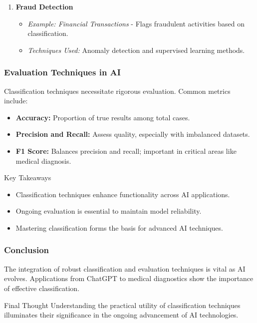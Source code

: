 \documentclass[aspectratio=169]{beamer}
\begin{document}
\begin{frame}[fragile]
\begin{enumerate}
        \item \textbf{Fraud Detection}
            \begin{itemize}
                \item \textit{Example: Financial Transactions} - Flags fraudulent activities based on classification.
                \item \textit{Techniques Used:} Anomaly detection and supervised learning methods.
            \end{itemize}
    \end{enumerate}
\end{frame}

\begin{frame}[fragile]
    \frametitle{Evaluation Techniques in AI}
    
    Classification techniques necessitate rigorous evaluation. Common metrics include:
    
    \begin{itemize}
        \item \textbf{Accuracy:} Proportion of true results among total cases.
        \item \textbf{Precision and Recall:} Assess quality, especially with imbalanced datasets.
        \item \textbf{F1 Score:} Balances precision and recall; important in critical areas like medical diagnosis.
    \end{itemize}
    
    \begin{block}{Key Takeaways}
        \begin{itemize}
            \item Classification techniques enhance functionality across AI applications.
            \item Ongoing evaluation is essential to maintain model reliability.
            \item Mastering classification forms the basis for advanced AI techniques.
        \end{itemize}
    \end{block}
\end{frame}

\begin{frame}[fragile]
    \frametitle{Conclusion}
    
    The integration of robust classification and evaluation techniques is vital as AI evolves. Applications from ChatGPT to medical diagnostics show the importance of effective classification.
    
    \begin{block}{Final Thought}
        Understanding the practical utility of classification techniques illuminates their significance in the ongoing advancement of AI technologies.
    \end{block}
\end{frame}
\end{document}
